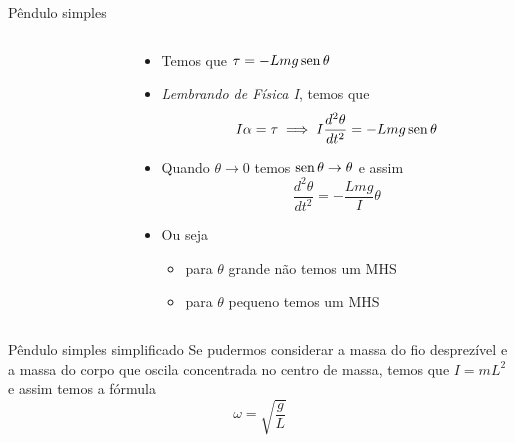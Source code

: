 \begin{frame}{Pêndulo simples}
    \begin{columns}[T]
        \begin{column}{0.4\textwidth}
        \end{column}
        \begin{column}{0.45\textwidth}
            \begin{itemize}
                \item Temos que \(\tau = -Lmg \operatorname{sen}{\theta}\)
                \item \textit{Lembrando de Física I}, temos que
                    \[
                        I\alpha = \tau \implies I\frac{d^2 \theta}{dt^2} = -Lmg\operatorname{sen}{\theta}
                    \]
                \item Quando \(\theta \to 0\) temos \(\operatorname{sen}{\theta} \to \theta\) e assim
                    \[
                        \frac{d^2\theta}{dt^2} = - \frac{Lmg}{I}\theta
                    \]
                \item Ou seja 
                    \begin{itemize}
                        \item para \(\theta\) grande não temos um MHS
                        \item para \(\theta\) pequeno temos um MHS
                    \end{itemize}
            \end{itemize}
        \end{column}

    \end{columns}
\end{frame}

\begin{frame}[c]{Pêndulo simples simplificado}
    Se pudermos considerar a massa do fio desprezível e a massa do corpo que oscila concentrada no centro de massa, temos que
    \(I=mL^2\) e assim temos a fórmula
    \[
        \omega = \sqrt{\frac{g}{L}}
    \]
\end{frame}

